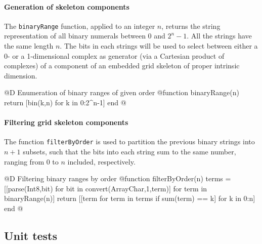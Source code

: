 \paragraph{Generation of skeleton components}
\label{sec:binaryRange}

The \texttt{binaryRange} function, applied to an integer $n$, returns the string representation of all binary numerals between 0 and $2^n -1$. All the strings have the same length $n$. The bits in each strings will be used to select between either a 0- or a 1-dimensional complex as generator (via a Cartesian product of complexes) of a component of an embedded grid skeleton of proper intrinsic dimension.

@D Enumeration of binary ranges of given order
@{function binaryRange(n)
	return [bin(k,n) for k in 0:2^n-1]
end
@}



\paragraph{Filtering grid skeleton components}
\label{sec:filterByOrder}

The function \texttt{filterByOrder} is used to partition the previous binary strings into $n+1$ subsets, such that the bits into each string sum to the same number, ranging from 0 to $n$ included, respectively.

@D Filtering binary ranges by order
@{function filterByOrder(n)
	terms = [[parse(Int8,bit) for bit in convert(Array{Char,1},term)] for term in binaryRange(n)]
	return [[term for term in terms if sum(term) == k] for k in 0:n]
end
@}


\subsection{Unit tests}

